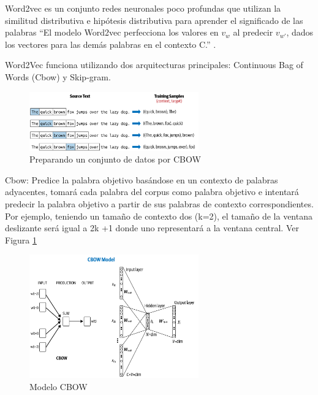 \begin{itemize}
	
Word2vec es un conjunto redes neuronales poco profundas que utilizan la similitud distributiva e hipótesis distributiva para aprender  el significado de las palabras ``El modelo Word2vec perfecciona los valores en $v_w$ al predecir $v_{w'}$, dados los vectores para las demás palabras en el contexto C.'' \cite[p. 95]{vajjala2020practical} .

Word2Vec funciona utilizando dos arquitecturas principales: Continuous Bag of Words (Cbow) y Skip-gram.

\begin{figure}
	\includegraphics[width=0.65\textwidth]{capitulo3/figuras/nlp3.png}
	\caption{Preparando un conjunto de datos por CBOW}
	\label{fig:nlp3}
\end{figure}

Cbow: Predice la palabra objetivo basándose en un contexto de palabras adyacentes, tomará cada palabra del corpus como palabra objetivo e intentará predecir la palabra objetivo a partir de sus palabras de contexto correspondientes. Por ejemplo, teniendo un tamaño de contexto dos (k=2), el  tamaño de la ventana deslizante será igual a 2k +1 donde uno representará  a la ventana central. Ver Figura \ref{fig:nlp3}



\begin{figure}[h!]
	\includegraphics[width=0.65\textwidth]{capitulo3/figuras/nlp4.png}
	\caption{Modelo CBOW}
	\label{fig:nlp4}
\end{figure}


\end{itemize}
